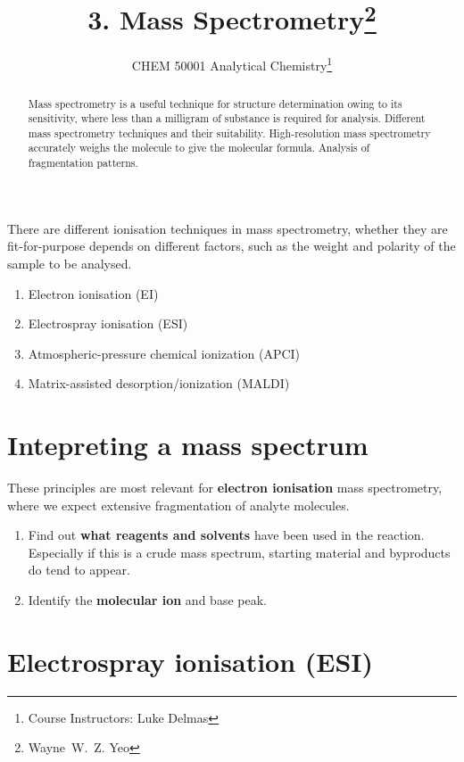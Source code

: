 \documentclass[a4paper]{tufte-handout}
\title{3. Mass Spectrometry\thanks{Wayne~W.~Z. Yeo}}
\author[ESB]{\textnormal{CHEM 50001} Analytical Chemistry\thanks{Course Instructors: Luke Delmas}}
\theoremstyle{definition}
\begin{document}
\maketitle%

\begin{abstract}
\noindent
Mass spectrometry is a useful technique for structure determination owing to its sensitivity, where less than a milligram
of substance is required for analysis. Different mass spectrometry techniques and their suitability. High-resolution
mass spectrometry accurately weighs the molecule to give the molecular formula. Analysis of fragmentation patterns.

\end{abstract}


There are different ionisation techniques in mass spectrometry, whether they are fit-for-purpose depends on
different factors, such as the weight and polarity of the sample to be analysed.

\begin{enumerate}
  \item Electron ionisation (EI)
  \item Electrospray ionisation (ESI)
  \item Atmospheric-pressure chemical ionization (APCI)
  \item Matrix-assisted desorption/ionization (MALDI)
\end{enumerate}

\section{Intepreting a mass spectrum}

These principles are most relevant for \textbf{electron ionisation} mass spectrometry, where we expect
extensive fragmentation of analyte molecules.

\begin{enumerate}
  \item Find out \textbf{what reagents and solvents} have been used in the reaction. Especially if this
  is a crude mass spectrum, starting material and byproducts do tend to appear.
  \item Identify the \textbf{molecular ion} and base peak.
\end{enumerate} 

\section{Electrospray ionisation \textnormal{(ESI)}}
\end{document}
